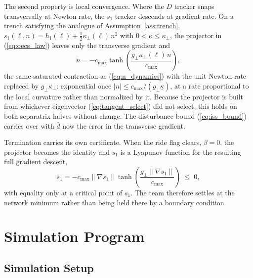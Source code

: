 \documentclass[lettersize,journal]{IEEEtran}
\begin{document}
The second property is local convergence. Where the $D$ tracker snaps
transversally at Newton rate, the $s_1$ tracker descends at gradient
rate. On a trench satisfying the analogue of Assumption~\ref{ass:trench},
$s_1(\ell, n) = h_1(\ell) + \tfrac{1}{2}\kappa_\perp(\ell)\,n^2$ with
$0 < \underline{\kappa} \leq \kappa_\perp$, the projector in
(\ref{eq:oecs_law}) leaves only the transverse gradient and
\begin{equation}
    \dot{n} = -c_{\max}\tanh\!\left(
    \frac{g_\perp \kappa_\perp(\ell)\,n}{c_{\max}}\right),
    \label{eq:oecs_n_dynamics}
\end{equation}
the same saturated contraction as (\ref{eq:n_dynamics}) with the unit
Newton rate replaced by $g_\perp\kappa_\perp$: exponential once $|n|
\leq c_{\max}/(g_\perp\underline{\kappa})$, at a rate proportional to
the local curvature rather than normalized by it. Because the projector
is built from whichever eigenvector (\ref{eq:tangent_select}) did not
select, this holds on both separatrix halves without change. The
disturbance bound (\ref{eq:iss_bound}) carries over with $\bar{d}$ now
the error in the transverse gradient.

Termination carries its own certificate. When the ride flag clears,
$\beta = 0$, the projector becomes the identity and $s_1$ is a Lyapunov
function for the resulting full gradient descent,
\begin{equation}
    \dot{s}_1 = -c_{\max}\|\nabla s_1\|
    \tanh\!\left(\frac{g_\perp\|\nabla s_1\|}{c_{\max}}\right)
    \;\leq\; 0,
    \label{eq:s1_lyapunov}
\end{equation}
with equality only at a critical point of $s_1$. The team therefore
settles at the network minimum rather than being held there by a
boundary condition.

\section{Simulation Program}
\label{sec:methods}

\subsection{Simulation Setup}
\end{document}
